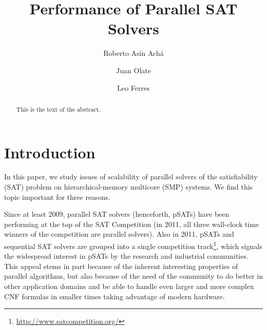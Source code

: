\documentclass{llncs}
\begin{document}


 \newcommand{\assign}{$\,$:=$\;$}
\newcommand{\barc}{Barelogic$^S$}
\newcommand{\pling}{{\tt plingeling}}

\title{Performance of Parallel SAT Solvers}

\author{Roberto As\'in Ach\'a \and Juan Olate  \and Leo Ferres }



\maketitle

\begin{abstract}
This is the text of the abstract.
\end{abstract}

\section{Introduction}

In this paper, we study issues of scalability of parallel solvers of
the satisfiability (SAT) problem on hierarchical-memory multicore
(SMP) systems. We find this topic important for three reasons.

Since at least 2009, parallel SAT solvers (henceforth, pSATs) have
been performing at the top of the SAT Competition (in 2011, all three
wall-clock time winners of the competition are parallel solvers).
Also in 2011, pSATs and sequential SAT solvers are grouped into a
single competition
track\footnote{\url{http://www.satcompetition.org/}}, which signals
the widespread interest in pSATs by the research and industrial
communities. This appeal stems in part because of the inherent
interesting properties of parallel algorithms, but also because of the
need of the community to do better in other application domains and be
able to handle even larger and more complex CNF formulas in smaller
times taking advantage of modern hardware.
\end{document}
